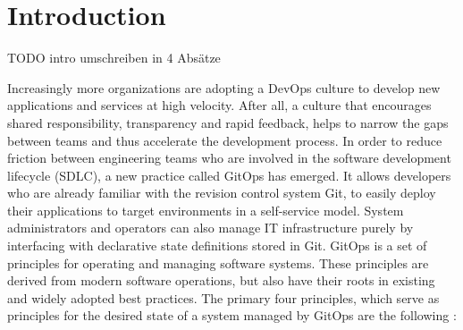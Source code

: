 \chapter{Introduction}

\noindent
TODO intro umschreiben in 4 Absätze











\bigskip


Increasingly more organizations are adopting 
a DevOps culture to develop new applications and services at high velocity. 
After all, a culture that encourages shared responsibility, transparency and rapid feedback, 
helps to narrow the gaps between teams and thus accelerate the development process.
In order to
reduce friction between engineering teams who are involved in the software development lifecycle (SDLC),
a new practice called GitOps has emerged.
It allows developers who are already familiar with the revision control system Git,
to easily deploy their applications to target environments in a self-service model.
System administrators and operators can also manage IT infrastructure
purely by interfacing with declarative state definitions stored in Git.
GitOps is a set of principles for operating and managing software systems.
These principles are derived from modern software operations, but also have their roots 
in existing and widely adopted best practices. The primary four principles,
which serve as principles for the desired state of a
system managed by GitOps are the following \autocite{gitopsPrinciplesv100}:

